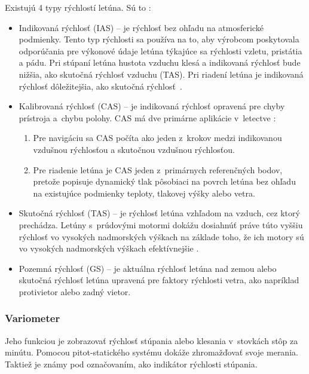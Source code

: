 Existujú 4 typy rýchlostí letúna. Sú to \cite{Airspeed}:
\begin{itemize}
    \item Indikovaná rýchlosť (IAS) – je rýchlosť bez ohľadu na atmosferické podmienky. Tento typ rýchlosti sa používa na to, aby výrobcom poskytovala odporúčania pre výkonové údaje letúna týkajúce sa rýchlosti vzletu, pristátia a pádu. Pri stúpaní letúna hustota vzduchu klesá a indikovaná rýchlosť bude nižšia, ako skutočná rýchlosť vzduchu (TAS). Pri riadení letúna je indikovaná rýchlosť dôležitejšia, ako skutočná rýchlosť~\cite{Indicated}. 
    \item Kalibrovaná rýchlosť (CAS) – je indikovaná rýchlosť opravená pre chyby prístroja a~chybu polohy. CAS má dve primárne aplikácie v~letectve \cite{Calibrated}:
    \begin{enumerate}
        \item Pre navigáciu sa CAS počíta ako jeden z~krokov medzi indikovanou vzdušnou rýchlosťou a skutočnou vzdušnou rýchlosťou.
        \item Pre riadenie letúna je CAS jeden z~primárnych referenčných bodov, pretože popisuje dynamický tlak pôsobiaci na povrch letúna bez ohľadu na existujúce podmienky teploty, tlakovej výšky alebo vetra.
    \end{enumerate}
    \item Skutočná rýchlosť (TAS) – je rýchlosť letúna vzhľadom na vzduch, cez ktorý prechádza. Letúny s~prúdovými motormi dokážu dosiahnúť práve túto vyššiu rýchlosť vo vysokých nadmorských výškach na základe toho, že ich motory sú vo vysokých nadmorských výškach efektívnejšie \cite{Airspeed}.
    \item Pozemná rýchlosť (GS) – je aktuálna rýchlosť letúna nad zemou alebo skutočná rýchlosť letúna upravená pre faktory rýchlosti vetra, ako napríklad protivietor alebo zadný vietor.
\end{itemize}

\bigskip
\subsubsection{Variometer}
Jeho funkciou je zobrazovať rýchlosť stúpania alebo klesania v~stovkách stôp za minútu. Pomocou pitot-statického systému dokáže zhromažďovať svoje merania. Taktiež je známy pod označovaním, ako indikátor rýchlosti stúpania.

